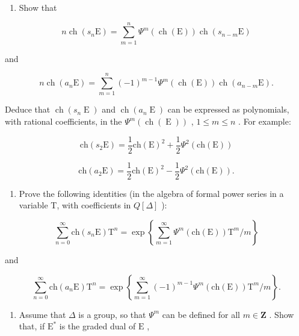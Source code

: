 \begin{enumerate}
\def\labelenumi{\alph{enumi})}
\tightlist
\item
  Show that
\end{enumerate}

\[
n \operatorname{ch} (s _ {n} \mathrm{E}) = \sum_ {m = 1} ^ {n} \Psi^ {m} (\operatorname{ch} (\mathrm{E})) \operatorname{ch} (s _ {n - m} \mathrm{E})
\]

and

\[
n \operatorname{ch} (a _ {n} \mathrm{E}) = \sum_ {m = 1} ^ {n} (- 1) ^ {m - 1} \varPsi^ {m} (\operatorname{ch} (\mathrm{E})) \operatorname{ch} (a _ {n - m} \mathrm{E}).
\]

Deduce that \(\operatorname{ch}(s_{n}\operatorname{E})\) and \(\operatorname{ch}(a_{n}\operatorname{E})\) can be expressed as polynomials, with rational coefficients, in the \(\varPsi^{m}(\operatorname{ch}(\operatorname{E}))\) , \(1 \leq m \leq n\) . For example:

\[
\mathrm{ch} (s _ {2} \mathrm{E}) = \frac {1}{2} \mathrm{ch} (\mathrm{E}) ^ {2} + \frac {1}{2} \varPsi^ {2} (\mathrm{ch} (\mathrm{E}))
\]

\[
\mathrm{ch} (a _ {2} \mathrm{E}) = \frac {1}{2} \mathrm{ch} (\mathrm{E}) ^ {2} - \frac {1}{2} \varPsi^ {2} (\mathrm{ch} (\mathrm{E})).
\]

\begin{enumerate}
\def\labelenumi{\alph{enumi})}
\setcounter{enumi}{1}
\tightlist
\item
  Prove the following identities (in the algebra of formal power series in a variable T, with coefficients in \(Q[\Delta]\) ):
\end{enumerate}

\[
\sum_ {n = 0} ^ {\infty} \mathrm{ch} (s _ {n} \mathrm{E}) \mathrm{T} ^ {n} = \exp \left\{\sum_ {m = 1} ^ {\infty} \varPsi^ {m} (\mathrm{ch(E)}) \mathrm{T} ^ {m} / m \right\}
\]

and

\[
\sum_ {n = 0} ^ {\infty} \mathrm{ch} (a _ {n} \mathrm{E}) \mathrm{T} ^ {n} = \exp \left\{\sum_ {m = 1} ^ {\infty} (- 1) ^ {m - 1} \varPsi^ {m} (\mathrm{ch(E)}) \mathrm{T} ^ {m} / m \right\}.
\]

\begin{enumerate}
\def\labelenumi{\alph{enumi})}
\setcounter{enumi}{2}
\tightlist
\item
  Assume that \(\Delta\) is a group, so that \(\varPsi^{m}\) can be defined for all \(m\in \mathbf{Z}\) . Show that, if \(\mathrm{E}^*\) is the graded dual of \(\mathrm{E}\) ,
\end{enumerate}

